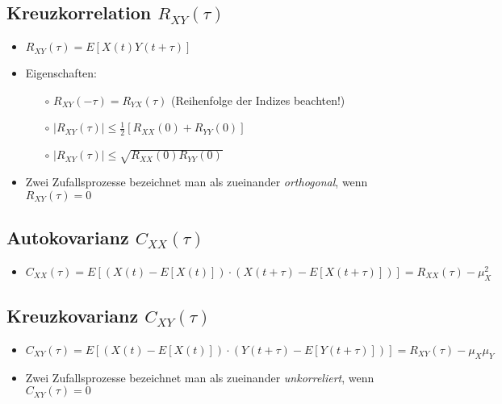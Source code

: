 \documentclass[10pt, a4paper]{article}
\begin{document}
\subsection{Kreuzkorrelation $R_{XY}(\tau)$}
\begin{itemize}
  \item $R_{XY}(\tau) = E[X(t)Y(t+\tau)]$
  \item Eigenschaften:
  \begin{itemize}
     \item[$\circ$] $R_{XY}(-\tau) = R_{YX}(\tau)$  \hspace{20pt} (Reihenfolge der Indizes beachten!)
     \item[$\circ$] $\mid \! R_{XY}(\tau) \! \mid  \leq \frac{1}{2} \left[ R_{XX}(0)+R_{YY}(0)\right] $  
     \item[$\circ$] $\mid \! R_{XY}(\tau) \! \mid \leq \sqrt{R_{XX}(0)R_{YY}(0)}$  
  \end{itemize} 
  \item Zwei Zufallsprozesse bezeichnet man als zueinander \textit{orthogonal},
        wenn $R_{XY}(\tau) = 0$
\end{itemize} 

\subsection{Autokovarianz $C_{XX}(\tau)$}
\begin{itemize}
  \item $C_{XX}(\tau) = E\!\left[ \left( X(t)      - E[X(t)]      \right) \cdot
                                  \left( X(t+\tau) - E[X(t+\tau)] \right) \right] =
                        R_{XX}(\tau) - \mu^{2}_{X} $
\end{itemize} 

\subsection{Kreuzkovarianz $C_{XY}(\tau)$}
\begin{itemize}
  \item $C_{XY}(\tau) = E\!\left[ \left( X(t)      - E[X(t)]      \right) \cdot
                                  \left( Y(t+\tau) - E[Y(t+\tau)] \right) \right] =
                        R_{XY}(\tau) - \mu_{X}\mu_{Y} $
  \item Zwei Zufallsprozesse bezeichnet man als zueinander \textit{unkorreliert},
        wenn $C_{XY}(\tau) = 0$

\end{itemize} 
\end{document}
